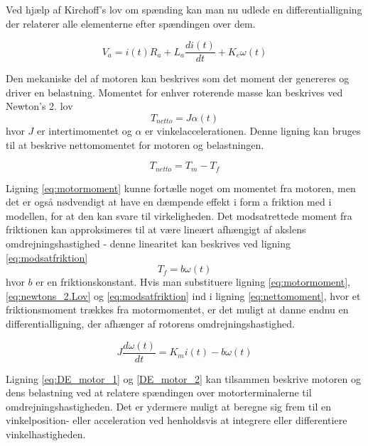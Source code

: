 Ved hjælp af Kirchoff's lov om spænding kan man nu udlede en differentialligning der relaterer alle elementerne efter spændingen over dem.

\begin{equation}\label{eq:DE_motor_1}
V_{a}=i(t)R_{a}+L_{a}\dfrac{di(t)}{dt}+K_{e}\omega(t)
\end{equation}

Den mekaniske del af motoren kan beskrives som det moment der genereres og driver en belastning. Momentet for enhver roterende masse kan beskrives ved Newton's 2. lov \\
\begin{equation}\label{eq:newtons_2.Lov}
T_{netto}=J\alpha(t)
\end{equation}
hvor $J$ er intertimomentet og $\alpha$ er vinkelaccelerationen. Denne ligning kan bruges til at beskrive nettomomentet for motoren og belastningen. 

\begin{equation}\label{eq:nettomoment}
T_{netto}=T_{m}-T_{f}
\end{equation}

Ligning \ref{eq:motormoment} kunne fortælle noget om momentet fra motoren, men det er også nødvendigt at have en dæmpende effekt i form a friktion med i modellen, for at den kan svare til virkeligheden. Det modsatrettede moment fra friktionen kan approksimeres til at være lineært afhængigt af akslens omdrejningshastighed - denne linearitet kan beskrives ved ligning \eqref{eq:modsatfriktion}
\begin{equation}\label{eq:modsatfriktion}
T_{f}=b\omega(t)
\end{equation}
hvor $b$ er en friktionskonstant. Hvis man substituere ligning \ref{eq:motormoment},\ref{eq:newtons_2.Lov} og \ref{eq:modsatfriktion} ind i ligning \ref{eq:nettomoment}, hvor et friktionsmoment trækkes fra motormomentet, er det muligt at danne endnu en differentialligning, der afhænger af rotorens omdrejningshastighed.

\begin{equation}\label{DE_motor_2}
J\dfrac{d\omega(t)}{dt}=K_{m}i(t)-b\omega(t)
\end{equation}

Ligning \ref{eq:DE_motor_1} og \ref{DE_motor_2} kan tilsammen beskrive motoren og dens belastning ved at relatere spændingen over motorterminalerne til omdrejningshastigheden. Det er ydermere muligt at beregne sig frem til en vinkelposition- eller acceleration ved henholdsvis at integrere eller differentiere vinkelhastigheden.

